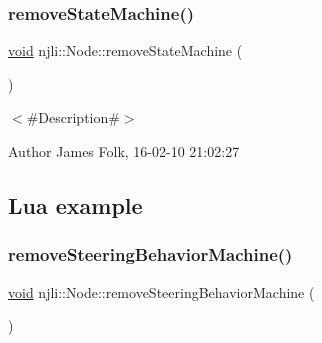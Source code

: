 \begin{DoxyCodeInclude}
\end{DoxyCodeInclude}
\mbox{\label{classnjli_1_1_node_ab3c28554c6727257099723089739f1c1}} 
\subsubsection{\texorpdfstring{remove\+State\+Machine()}{removeStateMachine()}}
{\footnotesize\ttfamily \mbox{\hyperlink{_thread_8h_af1e856da2e658414cb2456cb6f7ebc66}{void}} njli\+::\+Node\+::remove\+State\+Machine (\begin{DoxyParamCaption}{ }\end{DoxyParamCaption})}



$<$\#\+Description\#$>$ 

\begin{DoxyAuthor}{Author}
James Folk, 16-\/02-\/10 21\+:02\+:27
\end{DoxyAuthor}
\hypertarget{classnjli_1_1_steering_behavior_wander_ex1}{}\subsection{Lua example}\label{classnjli_1_1_steering_behavior_wander_ex1}

\begin{DoxyCodeInclude}
\end{DoxyCodeInclude}
\mbox{\label{classnjli_1_1_node_a4a910c860697e885b2e1d98ea4a71acd}} 
\subsubsection{\texorpdfstring{remove\+Steering\+Behavior\+Machine()}{removeSteeringBehaviorMachine()}}
{\footnotesize\ttfamily \mbox{\hyperlink{_thread_8h_af1e856da2e658414cb2456cb6f7ebc66}{void}} njli\+::\+Node\+::remove\+Steering\+Behavior\+Machine (\begin{DoxyParamCaption}{ }\end{DoxyParamCaption})}

